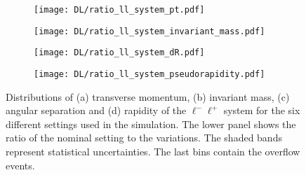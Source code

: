 \begin{figure}[H]
    \centering
    \begin{subfigure}{0.49\textwidth}
        \centering
        \texttt{[image: DL/ratio\_ll\_system\_pt.pdf]}
        \caption{}
        \label{app:subfig:pt(ll)_DL}
    \end{subfigure}
    \begin{subfigure}{0.49\textwidth}
        \centering
        \texttt{[image: DL/ratio\_ll\_system\_invariant\_mass.pdf]}
        \caption{}
        \label{app:subfig:m(ll)_DL}
    \end{subfigure}

    \vspace{0.2cm}
    
    \begin{subfigure}{0.49\textwidth}
        \centering
        \texttt{[image: DL/ratio\_ll\_system\_dR.pdf]}
        \caption{}
        \label{app:subfig:dR(ll)_DL}
    \end{subfigure}
    \begin{subfigure}{0.49\textwidth}
        \centering
        \texttt{[image: DL/ratio\_ll\_system\_pseudorapidity.pdf]}
        \caption{}
        \label{app:subfig:eta(ll)_DL}
    \end{subfigure}
    \caption{Distributions of (a) transverse momentum, (b) invariant mass,  (c) angular separation and (d) rapidity of the $\ell^-\ell^+$ system for the six different settings used in the simulation. The lower panel shows the ratio of the nominal setting to the variations. The shaded bands represent statistical uncertainties. The last bins contain the overflow events.}
    \label{app:fig:ll_DL}
\end{figure}



